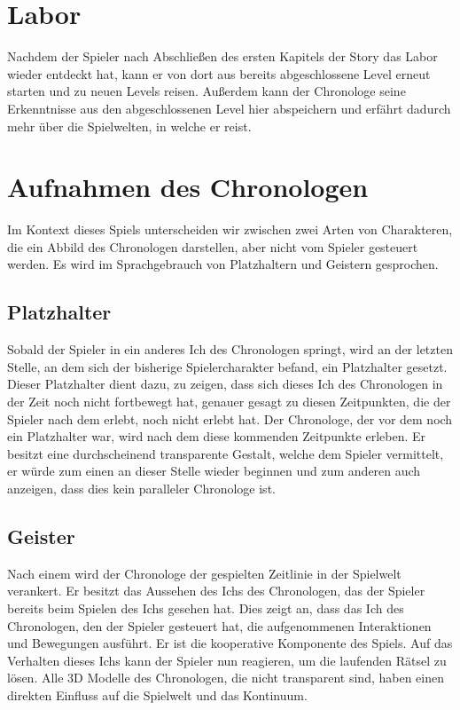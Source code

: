 \section{Labor}
Nachdem der Spieler nach Abschließen des ersten Kapitels der Story das Labor wieder entdeckt hat, kann er von dort aus bereits abgeschlossene Level erneut starten und zu neuen Levels reisen. Außerdem kann der Chronologe seine Erkenntnisse aus den abgeschlossenen Level hier abspeichern und erfährt dadurch mehr über die Spielwelten, in welche er reist.

\section{Aufnahmen des Chronologen}\label{sec:npc}
Im Kontext dieses Spiels unterscheiden wir zwischen zwei Arten von  Charakteren, die ein Abbild des Chronologen darstellen, aber nicht vom Spieler gesteuert werden. Es wird im Sprachgebrauch von Platzhaltern und Geistern gesprochen.

\subsection{Platzhalter}
Sobald der Spieler in ein anderes Ich des Chronologen springt, wird an der letzten Stelle, an dem sich der bisherige Spielercharakter befand, ein Platzhalter gesetzt. Dieser Platzhalter dient dazu, zu zeigen, dass sich dieses Ich des Chronologen in der Zeit noch nicht fortbewegt hat, genauer gesagt zu diesen Zeitpunkten, die der Spieler nach dem  erlebt, noch nicht erlebt hat. Der Chronologe, der vor dem  noch ein Platzhalter war, wird nach dem  diese kommenden Zeitpunkte erleben. Er besitzt eine durchscheinend transparente Gestalt, welche dem Spieler vermittelt, er würde zum einen an dieser Stelle wieder beginnen und zum anderen auch anzeigen, dass dies kein paralleler Chronologe ist.

\subsection{Geister}
Nach einem  wird der Chronologe der gespielten Zeitlinie in der Spielwelt verankert.
Er besitzt das Aussehen des Ichs des Chronologen, das der Spieler bereits beim Spielen des Ichs gesehen hat. Dies zeigt an, dass das Ich des Chronologen, den der Spieler gesteuert hat, die aufgenommenen Interaktionen und Bewegungen ausführt. Er ist die kooperative Komponente des Spiels. Auf das Verhalten dieses Ichs kann der Spieler nun reagieren, um die laufenden Rätsel zu lösen. 
Alle 3D Modelle des Chronologen, die nicht transparent sind, haben einen direkten Einfluss auf die Spielwelt und das Kontinuum.

